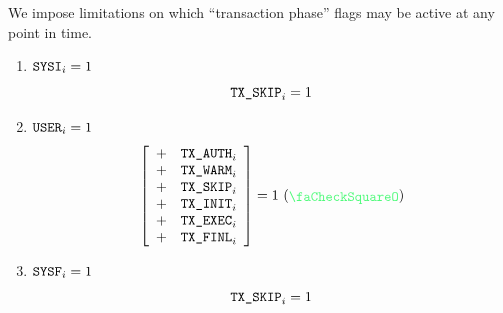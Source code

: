 We impose limitations on which ``transaction phase'' flags may be active at any point in time.
\begin{enumerate}
        \item
                \label{hub: system: hub stamp: SYSI transactions are always SKIP}
                \If $\texttt{SYSI} _{i} = 1$ \Then
                \[
                        \texttt{TX}\texttt{\_SKIP} _{i} = 1
                \]
        \item
                \If $\texttt{USER} _{i} = 1$ \Then
                \[
                        \left[ \begin{array}{cl}
                                + & \txAuth _{i} \\
                                + & \txWarm _{i} \\
                                + & \txSkip _{i} \\
                                + & \txInit _{i} \\
                                + & \txExec _{i} \\
                                + & \txFinl _{i} \\
                        \end{array} \right]
                        = 1 ~ (\sanityCheck)
                \]
        \item
                \label{hub: system: hub stamp: SYSF transactions are always SKIP}
                \If $\texttt{SYSF} _{i} = 1$ \Then
                \[
                        \texttt{TX}\texttt{\_SKIP} _{i} = 1
                \]
\end{enumerate}
